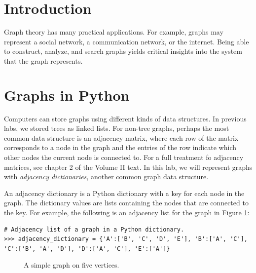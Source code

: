 \label{lab:SixDegreesKevinBacon}


\section*{Introduction}

Graph theory has many practical applications.
For example, graphs may represent a social network, a communication network, or the internet.
Being able to construct, analyze, and search graphs yields critical insights into the system that the graph represents.

\section*{Graphs in Python}

Computers can store graphs using different kinds of data structures.
In previous labs, we stored trees as linked lists.
For non-tree graphs, perhaps the most common data structure is an adjacency matrix, where each row of the matrix corresponds to a node in the graph and the entries of the row indicate which other nodes the current node is connected to.
For a full treatment fo adjacency matrices, see chapter 2 of the Volume II text.
In this lab, we will represent graphs with \emph{adjacency dictionaries}, another common graph data structure.

An adjacency dictionary is a Python dictionary with a key for each node in the graph.
The dictionary values are lists containing the nodes that are connected to the key.
For example, the following is an adjacency list for the graph in Figure \ref{fig:simple_graph}:

\begin{lstlisting}
# Adjacency list of a graph in a Python dictionary.
>>> adjacency_dictionary = {'A':['B', 'C', 'D', 'E'], 'B':['A', 'C'],
'C':['B', 'A', 'D'], 'D':['A', 'C'], 'E':['A']}
\end{lstlisting}

\begin{figure}
\centering
{}
\caption{A simple graph on five vertices.}
\label{fig:simple_graph}
\end{figure}

